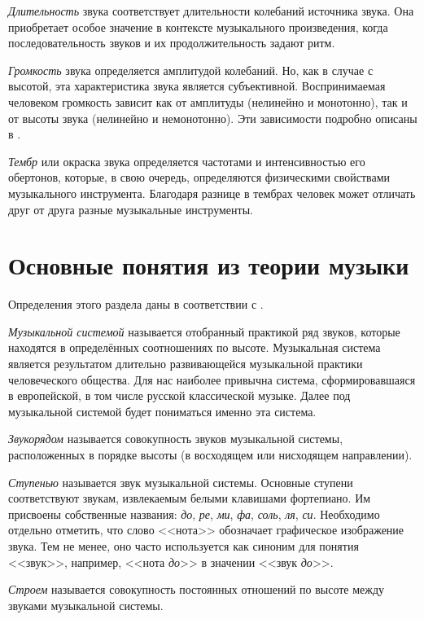 \emph{Длительность} звука соответствует длительности колебаний источника звука.
Она приобретает особое значение в контексте музыкального произведения, когда
последовательность звуков и их продолжительность задают ритм.

\emph{Громкость} звука определяется амплитудой колебаний. Но, как в случае с
высотой, эта характеристика звука является субъективной. Воспринимаемая
человеком громкость зависит как от амплитуды (нелинейно и монотонно), так и от
высоты звука (нелинейно и немонотонно). Эти зависимости подробно описаны в
\cite{Fastl2007}.

\emph{Тембр} или окраска звука определяется частотами и интенсивностью его
обертонов, которые, в свою очередь, определяются физическими свойствами
музыкального инструмента. Благодаря разнице в тембрах человек может отличать
друг от друга разные музыкальные инструменты.

\section{Основные понятия из теории музыки} \label{sectT_music}

Определения этого раздела даны в соответствии с \cite{Sposobin2012}.

\emph{Музыкальной системой} называется отобранный практикой ряд звуков, которые
находятся в определённых соотношениях по высоте. Музыкальная система является
результатом длительно развивающейся музыкальной практики человеческого общества.
Для нас наиболее привычна система, сформировавшаяся в европейской, в том числе
русской классической музыке. Далее под музыкальной системой будет пониматься
именно эта система.

\emph{Звукорядом} называется совокупность звуков музыкальной системы,
расположенных в порядке высоты (в восходящем или нисходящем направлении).

\emph{Ступенью} называется звук музыкальной системы. Основные ступени
соответствуют звукам, извлекаемым белыми клавишами фортепиано. Им присвоены
собственные названия: \emph{до}, \emph{ре}, \emph{ми}, \emph{фа}, \emph{соль},
\emph{ля}, \emph{си}. Необходимо отдельно отметить, что слово <<нота>>
обозначает графическое изображение звука. Тем не менее, оно часто используется
как синоним для понятия <<звук>>, например, <<нота \emph{до}>> в значении
<<звук \emph{до}>>.

\emph{Строем} называется совокупность постоянных отношений по высоте между
звуками музыкальной системы.

